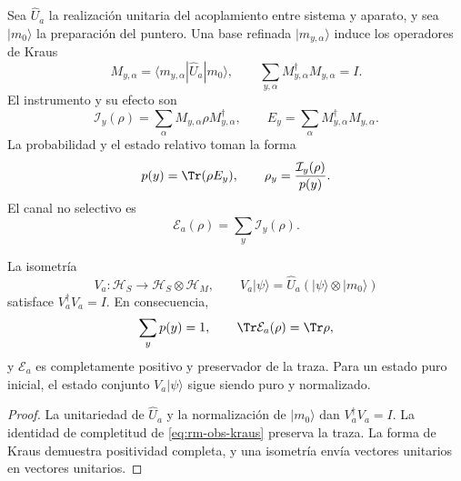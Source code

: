 Sea \(\widehat U_a\) la realizaci\'on unitaria del acoplamiento entre
sistema y aparato, y sea \(|m_0\rangle\) la preparaci\'on del puntero. Una
base refinada \(|m_{y,\alpha}\rangle\) induce los operadores de Kraus
\begin{equation}
 M_{y,\alpha}
 =\langle m_{y,\alpha}|\widehat U_a|m_0\rangle,
 \qquad
 \sum_{y,\alpha}M_{y,\alpha}^{\dagger}M_{y,\alpha}=I.
 \label{eq:rm-obs-kraus}
\end{equation}
El instrumento y su efecto son
\begin{equation}
 \mathcal I_y(\rho)
 =\sum_\alpha M_{y,\alpha}\rho M_{y,\alpha}^{\dagger},
 \qquad
 E_y=\sum_\alpha M_{y,\alpha}^{\dagger}M_{y,\alpha}.
 \label{eq:rm-obs-instrument}
\end{equation}
La probabilidad y el estado relativo toman la forma
\begin{equation}
 p(y)=\Tr(\rho E_y),
 \qquad
 \rho_y=\frac{\mathcal I_y(\rho)}{p(y)}.
 \label{eq:rm-obs-general-conditioned-state}
\end{equation}
El canal no selectivo es
\begin{equation}
 \mathcal E_a(\rho)=\sum_y\mathcal I_y(\rho).
 \label{eq:rm-obs-unconditioned-channel}
\end{equation}

\begin{proposition}
\label{prop:rm-obs-global-channel}
La isometr\'ia
\begin{equation}
 V_a:\mathcal H_S\longrightarrow\mathcal H_S\otimes\mathcal H_M,
 \qquad
 V_a|\psi\rangle=\widehat U_a(|\psi\rangle\otimes|m_0\rangle)
 \label{eq:rm-obs-stinespring-isometry}
\end{equation}
satisface \(V_a^\dagger V_a=I\). En consecuencia,
\begin{equation}
 \sum_y p(y)=1,
 \qquad
 \Tr\mathcal E_a(\rho)=\Tr\rho,
 \label{eq:rm-obs-trace-preservation}
\end{equation}
y \(\mathcal E_a\) es completamente positivo y preservador de la traza.
Para un estado puro inicial, el estado conjunto
\(V_a|\psi\rangle\) sigue siendo puro y normalizado.
\end{proposition}

\begin{proof}
La unitariedad de \(\widehat U_a\) y la normalizaci\'on de
\(|m_0\rangle\) dan \(V_a^\dagger V_a=I\). La identidad de completitud de
\cref{eq:rm-obs-kraus} preserva la traza. La forma de Kraus demuestra
positividad completa, y una isometr\'ia env\'ia vectores unitarios en
vectores unitarios.
\end{proof}

